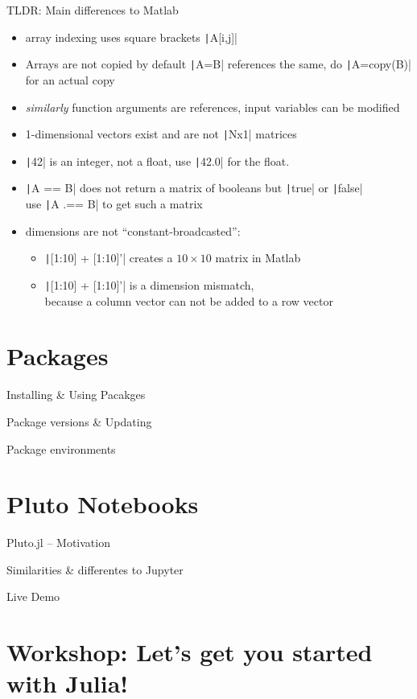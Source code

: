 \documentclass[aspectratio=169, 12pt]{beamer}
\begin{document}
    \begin{frame}[fragile]{TLDR: Main differences to Matlab}
        \begin{itemize}
            \item array indexing uses square brackets \texttt|A[i,j]|
            \item Arrays are not copied by default \texttt|A=B| references the same, do \texttt|A=copy(B)| for an actual copy
            \item \emph{similarly} function arguments are references, \alert{input variables can be modified}
            \item 1-dimensional vectors exist and are not \texttt|Nx1| matrices
            \item \texttt|42| is an integer, not a float, use \texttt|42.0| for the float.
            \item \texttt|A == B| does not return a matrix of booleans but \texttt|true| or \texttt|false|\\
            use \texttt|A .== B| to get such a matrix
            \item dimensions are not “constant-broadcasted”:\\
            \begin{itemize}
                \item \texttt|[1:10] + [1:10]'| creates a $10\times 10$ matrix in Matlab
                \item \texttt|[1:10] + [1:10]'| is a dimension mismatch,\\
                 because a column vector can not be added to a row vector
            \end{itemize}
        \end{itemize}
    \end{frame}
    \section{Packages}
    \begin{frame}{Installing \& Using Pacakges}

    \end{frame}
    \begin{frame}{Package versions \& Updating}

    \end{frame}
    \begin{frame}{Package environments}

    \end{frame}
    \section{Pluto Notebooks}
    \begin{frame}{Pluto.jl – Motivation}
    \end{frame}
    \begin{frame}{Similarities \& differentes to Jupyter}
    \end{frame}
    \begin{frame}{Live Demo}
    \end{frame}
    \section{Workshop: Let's get you started with Julia!}
\end{document}
